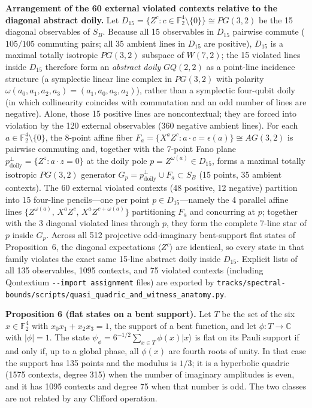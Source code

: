\documentclass[11pt,a4paper]{article}
\begin{document}
\textbf{Arrangement of the 60 external violated contexts relative to the diagonal abstract doily.} Let
\(D_{15}=\{Z^c : c\in\mathbb{F}_2^4\setminus\{0\}\}\cong PG(3,2)\) be the 15 diagonal observables of \(S_B\).
Because all 15 observables in \(D_{15}\) pairwise commute (\(105/105\) commuting pairs; all 35 ambient lines
in \(D_{15}\) are positive), \(D_{15}\) is a maximal totally isotropic \(PG(3,2)\) subspace of \(W(7,2)\);
the 15 violated lines inside \(D_{15}\) therefore form an \emph{abstract doily} \(GQ(2,2)\) as a point-line
incidence structure (a symplectic linear line complex in \(PG(3,2)\) with polarity
\(\omega(a_0,a_1,a_2,a_3)=(a_1,a_0,a_3,a_2)\)), rather than a symplectic four-qubit doily (in which
collinearity coincides with commutation and an odd number of lines are negative). Alone, those 15 positive
lines are noncontextual; they are forced into violation by the 120 external observables (360 negative ambient
lines). For each \(a\in\mathbb{F}_2^4\setminus\{0\}\), the 8-point affine fiber
\(F_a=\{X^a Z^c : a\cdot c=\epsilon(a)\}\cong AG(3,2)\) is pairwise commuting and, together with the 7-point
Fano plane \(p^\perp_{\text{doily}}=\{Z^z : a\cdot z=0\}\) at the doily pole \(p=Z^{\omega(a)}\in D_{15}\),
forms a maximal totally isotropic \(PG(3,2)\) generator \(G_p=p^\perp_{\text{doily}}\cup F_a\subset S_B\)
(15 points, 35 ambient contexts). The 60 external violated contexts (48 positive, 12 negative) partition into
15 four-line pencils---one per point \(p\in D_{15}\)---namely the 4 parallel affine lines
\(\{Z^{\omega(a)},\,X^a Z^c,\,X^a Z^{c+\omega(a)}\}\) partitioning \(F_a\) and concurring at \(p\); together
with the 3 diagonal violated lines through \(p\), they form the complete 7-line star of \(p\) inside \(G_p\).
Across all 512 projective odd-imaginary bent-support flat states of Proposition~6, the diagonal expectations
\(\langle Z^c\rangle\) are identical, so every state in that family violates the exact same 15-line abstract
doily inside \(D_{15}\). Explicit lists of all 135 observables, 1095 contexts, and 75 violated contexts
(including Qontextium \texttt{-\/-import\ assignment} files) are exported by
\nolinkurl{tracks/spectral-bounds/scripts/quasi_quadric_and_witness_anatomy.py}.

\textbf{Proposition 6 (flat states on a bent support).} Let \(T\) be the set of the six \(x \in \mathbb{F}_2^4\) with
\(x_0x_1 + x_2x_3 = 1\), the support of a bent function, and let \(\phi : T \to \mathbb{C}\) with \(|\phi| = 1\).
The state \(\psi_\phi = 6^{-1/2}\sum_{x \in T}\phi(x)|x\rangle\) is flat on its Pauli support if and only if, up
to a global phase, all \(\phi(x)\) are fourth roots of unity. In that case the support has 135 points and the
modulus is \(1/3\); it is a hyperbolic quadric (1575 contexts, degree 315) when the number of imaginary
amplitudes is even, and it has 1095 contexts and degree 75 when that number is odd. The two classes are
not related by any Clifford operation.
\end{document}
